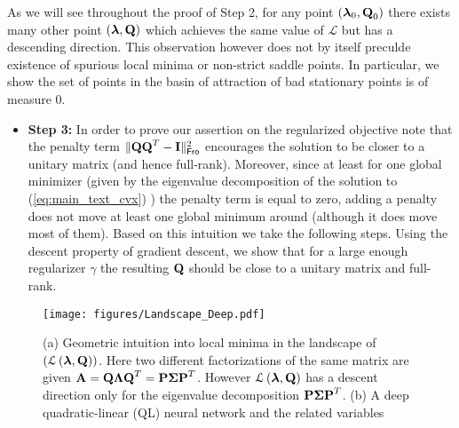 \documentclass[11pt]{article}
\theoremstyle{plain}
\DeclareMathOperator*{\llq}{\ensuremath{\mathcal{L} \left(\V{\lambda},\Mx{Q}\right)} }
\theoremstyle{plain}
\numberwithin{equation}{section}
\numberwithin{lemma}{section}
\numberwithin{theorem}{section}
\numberwithin{corollary}{section}
\numberwithin{observation}{section}
\numberwithin{definition}{section}
\numberwithin{example}{section}
\begin{document}
As we will see throughout the proof of Step 2, for any point $(\V{\lambda}_0,\Mx{Q}_0)$ there exists many other point $(\V{\lambda},\Mx{Q})$ which achieves the same value of $\mathcal{L}$ but has a descending direction. This observation however does not by itself preculde existence of spurious local minima or non-strict saddle points. In particular, we show the set of points in the basin of attraction of bad stationary points is of measure 0.



\begin{itemize}
\item \textbf{Step 3:} In order to prove our assertion on the regularized objective note that the penalty term $\|\Mx{QQ}^T-\Mx{I}\|_{\sf Fro}^2$ encourages the solution to be closer to a unitary matrix (and hence full-rank). Moreover, since at least for one global minimizer (given by the eigenvalue decomposition of the solution to (\ref{eq:main_text_cvx}) ) the penalty term is equal to zero, adding a penalty does not move at least one global minimum around (although it does move most of them). Based on this intuition we take the following steps. Using the descent property of gradient descent, we show that for a large enough regularizer $\gamma$ the resulting $\Mx{Q}$ should be close to a unitary matrix and full-rank.
\end{itemize}



\begin{figure}[H]
\begin{center}
\noindent
\texttt{[image: figures/Landscape\_Deep.pdf]}
\caption{(a) Geometric intuition into local minima in the landscape of $(\llq)$. Here two different factorizations of the same matrix are given $\Mx{A}= \Mx{Q \Lambda Q}^T = \Mx{P \Sigma P}^T$. However $\llq$ has a descent direction only for the eigenvalue decomposition $\Mx{P \Sigma P}^T$. (b) A deep quadratic-linear (QL) neural network and the related variables}
\label{fig:deep_notation}
\end{center}
\end{figure}
\end{document}
